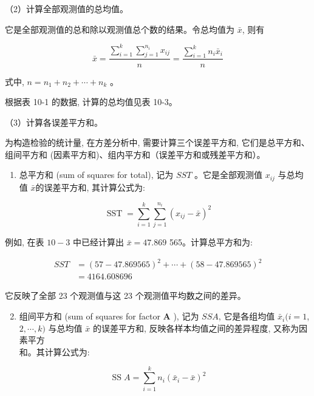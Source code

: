 \documentclass[10pt]{article}
\begin{document}
\begin{CJK*}{UTF8}{bsmi}
（2）计算全部观测值的总均值。

它是全部观测值的总和除以观测值总个数的结果。令总均值为 $\bar{x}$, 则有


\begin{equation*}
\bar{x}=\frac{\sum_{i=1}^{k} \sum_{j=1}^{n_{i}} x_{i j}}{n}=\frac{\sum_{i=1}^{k} n_{i} \bar{x}_{i}}{n} \tag{10.2}
\end{equation*}


式中, $n=n_{1}+n_{2}+\cdots+n_{k}$ 。

根据表 10-1 的数据, 计算的总均值见表 10-3。

（3）计算各误差平方和。

为构造检验的统计量, 在方差分析中, 需要计算三个误差平方和, 它们是总平方和、组间平方和 (因素平方和)、组内平方和（误差平方和或残差平方和）。

\begin{enumerate}
  \item 总平方和 (sum of squares for total), 记为 $S S T$ 。它是全部观测值 $x_{i j}$ 与总均值 $\bar{x}$的误差平方和, 其计算公式为:
\end{enumerate}


\begin{equation*}
\operatorname{SST}=\sum_{i=1}^{k} \sum_{j=1}^{n_{i}}\left(x_{i j}-\bar{x}\right)^{2} \tag{10.3}
\end{equation*}


例如, 在表 $10-3$ 中已经计算出 $\bar{x}=47.869$ 565。计算总平方和为:

$$
\begin{aligned}
S S T & =(57-47.869565)^{2}+\cdots+(58-47.869565)^{2} \\
& =4164.608696
\end{aligned}
$$

它反映了全部 23 个观测值与这 23 个观测值平均数之间的差异。

\begin{enumerate}
  \setcounter{enumi}{1}
  \item 组间平方和 (sum of squares for factor $\mathbf{A}$ ), 记为 $S S A$, 它是各组均值 $\bar{x}_{i}(i=1$, $2, \cdots, k)$ 与总均值 $\bar{x}$ 的误差平方和, 反映各样本均值之间的差异程度, 又称为因素平方\\
和。其计算公式为:
\end{enumerate}


\begin{equation*}
\operatorname{SS} A=\sum_{i=1}^{k} n_{i}\left(\bar{x}_{i}-\bar{x}\right)^{2} \tag{10.4}
\end{equation*}



\end{CJK*}
\end{document}
